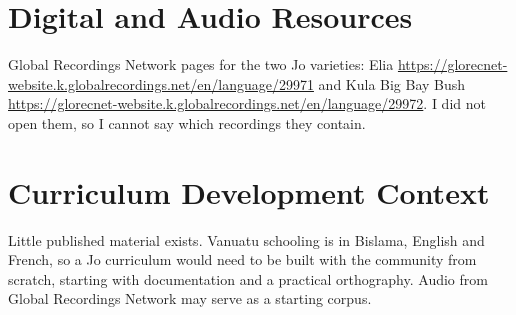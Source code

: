 \documentclass[12pt]{article}
\begin{document}
\section{Digital and Audio Resources}
Global Recordings Network pages for the two Jo varieties: Elia \url{https://glorecnet-website.k.globalrecordings.net/en/language/29971} and Kula Big Bay Bush \url{https://glorecnet-website.k.globalrecordings.net/en/language/29972}. I did not open them, so I cannot say which recordings they contain.

\section{Curriculum Development Context}
Little published material exists. Vanuatu schooling is in Bislama, English and French, so a Jo curriculum would need to be built with the community from scratch, starting with documentation and a practical orthography. Audio from Global Recordings Network may serve as a starting corpus.
\end{document}
